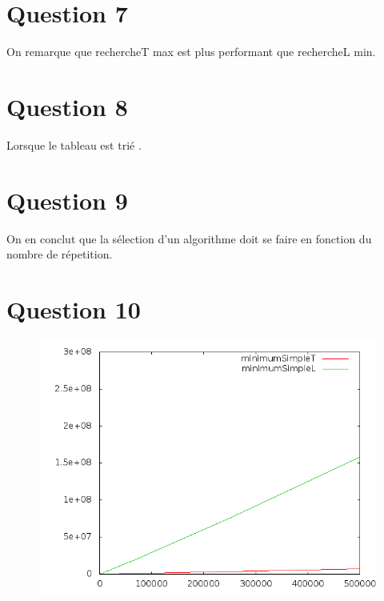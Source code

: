 \documentclass[a4paper,12pt]{report}
\begin{document}
\section*{Question 7}
On remarque que rechercheT max est plus performant que rechercheL min.

\section*{Question 8}
Lorsque le tableau est trié .

\section*{Question 9}
On en conclut que la sélection d'un algorithme doit se faire en fonction du nombre de répetition.

\newpage

\section*{Question 10}
\begin{figure}[!ht]
	\center
	\includegraphics[scale=0.4]{q10.png}
\end{figure}
\end{document}
